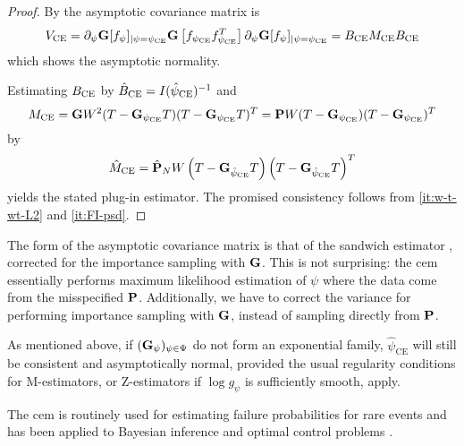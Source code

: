 \begin{proof}
    By  the asymptotic covariance matrix is 
    $$
    V_{\ce} = \partial_{\psi}\G [f_{\psi}]_{\vert \psi = \pce} \G \left[f_{\pce}f_{\pce}^{T}\right] \partial_{\psi}\G [f_{\psi}]_{\vert \psi = \pce}= B_{\ce}M_{\ce}B_{\ce}
    $$
    which shows the asymptotic normality. 

    Estimating $B_{\ce}$ by $\hat B_{\ce}= I(\hpce)^{-1}$ and $$M_{\ce} = \G W^{2} (T - \G_{\pce}T)(T - \G_{\pce}T)^{T} = \P W (T - \G_{\pce})(T - \G_{\pce})^T$$ by $$\hat M_{\ce} = \hat\P_{N} W \left( T - \G_{\hpce} T \right)\left( T - \G_{\hpce} T \right)^{T}$$
    yields the stated plug-in estimator. 
    The promised consistency follows from \ref{it:w-t-wt-L2} and \ref{it:FI-psd}.
\end{proof}

The form of the asymptotic covariance matrix is that of the sandwich estimator \citep{White1982Maximum}, corrected for the importance sampling with $\G$. This is not surprising: the \acrshort{cem} essentially performs maximum likelihood estimation of $\psi$ where the data come from the misspecified $\P$. Additionally, we have to correct the variance for performing importance sampling with $\G$, instead of sampling directly from $\P$.

As mentioned above, if $(\G_\psi)_{\psi \in \Psi}$ do not form an exponential family, $\hat\psi_{\text{CE}}$ will still be consistent and asymptotically normal, provided the usual regularity conditions for M-estimators, or Z-estimators if $\log g_{\psi}$ is sufficiently smooth, apply. 



The \gls{cem} is routinely used for estimating failure probabilities for rare events \citep{Homem-de-Mello2007Study} and has been applied to Bayesian inference \citep{Engel2023Bayesian,Ehre2023Certified} and optimal control problems \citep{Kappen2016Adaptive,Zhang2014Applications}.
